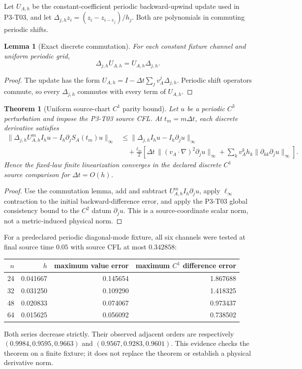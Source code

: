 \documentclass[11pt]{article}
\newtheorem{theorem}{Theorem}
\newtheorem{lemma}{Lemma}
\begin{document}
Let $U_{A,h}$ be the constant-coefficient periodic backward-upwind update used
in P3-T03, and let
$\Delta_{j,h}z_i=(z_i-z_{i-e_j})/h_j$.  Both are polynomials in commuting
periodic shifts.

\begin{lemma}[Exact discrete commutation]
For each constant fixture channel and uniform periodic grid,
\[
 \Delta_{j,h}U_{A,h}=U_{A,h}\Delta_{j,h}.
\]
\end{lemma}

\begin{proof}
The update has the form
$U_{A,h}=I-\Delta t\sum_jv_A^j\Delta_{j,h}$.  Periodic shift operators commute,
so every $\Delta_{j,h}$ commutes with every term of $U_{A,h}$.
\end{proof}

\begin{theorem}[Uniform source-chart $C^1$ parity bound]
Let $u$ be a periodic $C^3$ perturbation and impose the P3-T03 source CFL.
At $t_m=m\Delta t$, each discrete derivative satisfies
\begin{align*}
\|\Delta_{j,h}U_{A,h}^m I_hu-I_h\partial_jS_A(t_m)u\|_\infty
&\le
 \|\Delta_{j,h}I_hu-I_h\partial_ju\|_\infty\\
&\quad+\frac{t_m}{2}\left[
 \Delta t\,\|(v_A\!\cdot\!\nabla)^2\partial_ju\|_\infty
 +\sum_kv_A^kh_k\|\partial_{kk}\partial_ju\|_\infty
 \right].
\end{align*}
Hence the fixed-law finite linearization converges in the declared discrete
$C^1$ source comparison for $\Delta t=O(h)$.
\end{theorem}

\begin{proof}
Use the commutation lemma, add and subtract
$U_{A,h}^mI_h\partial_ju$, apply $\ell_\infty$ contraction to the initial
backward-difference error, and apply the P3-T03 global consistency bound to the
$C^2$ datum $\partial_ju$.  This is a source-coordinate scalar norm, not a
metric-induced physical norm.
\end{proof}

For a predeclared periodic diagonal-mode fixture, all six channels were tested
at final source time $0.05$ with source CFL at most $0.342858$:
\begin{center}
\begin{tabular}{rrrr}
\toprule
$n$ & $h$ & maximum value error & maximum $C^1$ difference error\\
\midrule
24 & 0.041667 & 0.145654 & 1.867688\\
32 & 0.031250 & 0.109290 & 1.418325\\
48 & 0.020833 & 0.074067 & 0.973437\\
64 & 0.015625 & 0.056092 & 0.738502\\
\bottomrule
\end{tabular}
\end{center}
Both series decrease strictly.  Their observed adjacent orders are respectively
$(0.9984,0.9595,0.9663)$ and $(0.9567,0.9283,0.9601)$.  This evidence checks
the theorem on a finite fixture; it does not replace the theorem or establish a
physical derivative norm.
\end{document}
